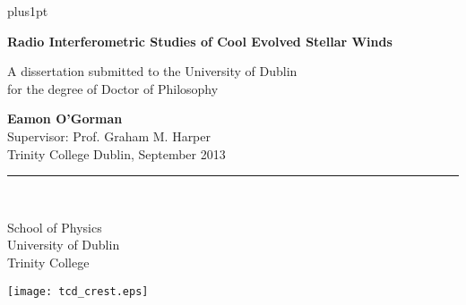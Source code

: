 \documentclass[a4paper, oneside,12pt]{Latex/Classes/PhDthesisPSnPDF}
\begin{document}
\renewcommand\baselinestretch{1.2}
\baselineskip=18pt plus1pt


\newcommand{\titlefont}{\bfseries \fontsize{22}{26.42pt}\selectfont}
\newcommand{\largetitlefont}{\bfseries \fontsize{29.88}{35.88pt}\selectfont}
\newcommand{\othertitlefont}{\fontsize{14.4}{17.28}\selectfont}
\newcommand{\authorfont}{\bfseries \fontsize{14.4}{17.28}\selectfont}
\newcommand{\informationfont}{\fontsize{10}{12}\selectfont}
\newcommand{\dedicationfont}{\slshape \fontsize{14.4}{17.28}\selectfont}

\newcommand{\thisyear}{\number\year}
\def\thismonth{\ifcase\month\or January\or February\or March\or
  April\or May\or June\or July\or August\or September\or October\or November\or December\fi}
\newcommand{\todaysdate}{\thismonth\space \thisyear}

\renewcommand{\baselinestretch}{1}
\newpage \thispagestyle{empty}
\vspace*{1.5cm}
\begin{flushright}



\Huge{\textbf{Radio Interferometric Studies of Cool Evolved Stellar Winds}}

\end{flushright}

\vspace*{4cm}
\begin{flushright}
A dissertation submitted to the University of Dublin \\
for the degree of Doctor of Philosophy
\end{flushright}

\vspace*{\fill}
\begin{flushright}
{\authorfont Eamon O'Gorman} \\[1mm]
Supervisor: Prof. Graham M. Harper\\[.5mm]
Trinity College Dublin, September 2013\\[.5mm]
\rule{0.9\textwidth}{0.5mm}\\[4mm]

\begin{minipage}[b][15mm][t]{12.5cm}
\raggedleft \sc
School of Physics\\
University of Dublin\\
Trinity College\\
\end{minipage}
\hspace*{1mm}
\begin{minipage}[b][15mm][t]{1.15cm}
\texttt{[image: tcd\_crest.eps]}
\end{minipage}

 \end{flushright}
\end{document}
